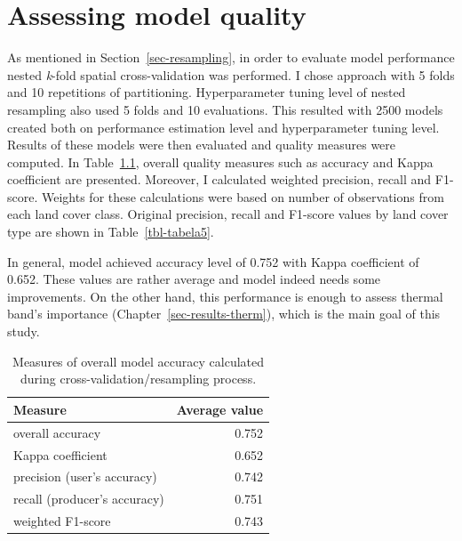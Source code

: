 \documentclass{amuthesis}
\begin{document}

\hypertarget{sec-results-eval}{%
\chapter{Assessing model quality}\label{sec-results-eval}}

As mentioned in Section~\ref{sec-resampling}, in order to evaluate model
performance nested \emph{k}-fold spatial cross-validation was performed.
I chose approach with 5 folds and 10 repetitions of partitioning.
Hyperparameter tuning level of nested resampling also used 5 folds and
10 evaluations. This resulted with 2500 models created both on
performance estimation level and hyperparameter tuning level. Results of
these models were then evaluated and quality measures were computed. In
Table~\ref{tbl-tabela4}, overall quality measures such as accuracy and
Kappa coefficient are presented. Moreover, I calculated weighted
precision, recall and F1-score. Weights for these calculations were
based on number of observations from each land cover class. Original
precision, recall and F1-score values by land cover type are shown in
Table~\ref{tbl-tabela5}.

In general, model achieved accuracy level of 0.752 with Kappa
coefficient of 0.652. These values are rather average and model indeed
needs some improvements. On the other hand, this performance is enough
to assess thermal band's importance (Chapter~\ref{sec-results-therm}),
which is the main goal of this study.

\hypertarget{tbl-tabela4}{}
\begin{table}
\caption{\label{tbl-tabela4}Measures of overall model accuracy calculated during
cross-validation/resampling process. }\tabularnewline

\centering
\begin{tabular}{|>{}l|>{}r|}
\toprule
\textbf{Measure} & \textbf{Average value}\\
\midrule
overall accuracy & 0.752\\
\hline
Kappa coefficient & 0.652\\
\hline
precision (user's accuracy) & 0.742\\
\hline
recall (producer's accuracy) & 0.751\\
\hline
weighted F1-score & 0.743\\
\bottomrule
\end{tabular}
\end{table}
\end{document}
